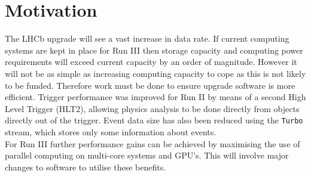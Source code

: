 \section{Motivation}
The LHCb upgrade will see a vast increase in data rate. If current computing systems are kept in place for Run III then storage capacity and computing power requirements will exceed current capacity by an order of magnitude\cite{Bozzi:2298181}. However it will not be as simple as increasing computing capacity to cope as this is not likely to be funded. Therefore work must be done to ensure upgrade software is more efficient. Trigger performance was improved for Run II by means of a second High Level Trigger (HLT2), allowing physics analysis to be done directly from objects directly out of the trigger. Event data size has also been reduced using the \verb|Turbo| stream, which stores only some information about events.\\
For Run III further performance gains can be achieved by maximising the use of parallel computing on multi-core systems and GPU's. This will involve major changes to software to utilise these benefits.


